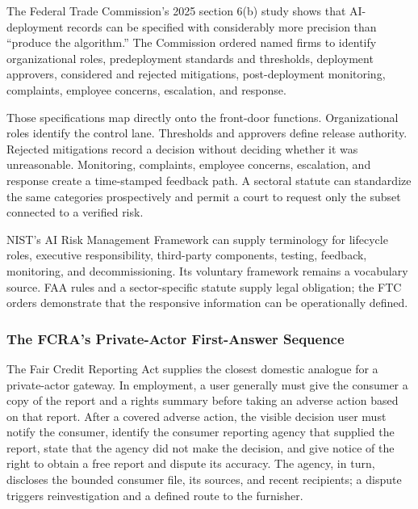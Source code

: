 The Federal Trade Commission's 2025 section 6(b) study shows that AI-deployment records can be specified with considerably more precision than ``produce the algorithm.'' The Commission ordered named firms to identify organizational roles, predeployment standards and thresholds, deployment approvers, considered and rejected mitigations, post-deployment monitoring, complaints, employee concerns, escalation, and response.

Those specifications map directly onto the front-door functions. Organizational roles identify the control lane. Thresholds and approvers define release authority. Rejected mitigations record a decision without deciding whether it was unreasonable. Monitoring, complaints, employee concerns, escalation, and response create a time-stamped feedback path. A sectoral statute can standardize the same categories prospectively and permit a court to request only the subset connected to a verified risk.

NIST's AI Risk Management Framework can supply terminology for lifecycle roles, executive responsibility, third-party components, testing, feedback, monitoring, and decommissioning. Its voluntary framework remains a vocabulary source. FAA rules and a sector-specific statute supply legal obligation; the FTC orders demonstrate that the responsive information can be operationally defined.

\subsubsection{The FCRA's Private-Actor First-Answer Sequence}

The Fair Credit Reporting Act supplies the closest domestic analogue for a private-actor gateway. In employment, a user generally must give the consumer a copy of the report and a rights summary before taking an adverse action based on that report. After a covered adverse action, the visible decision user must notify the consumer, identify the consumer reporting agency that supplied the report, state that the agency did not make the decision, and give notice of the right to obtain a free report and dispute its accuracy. The agency, in turn, discloses the bounded consumer file, its sources, and recent recipients; a dispute triggers reinvestigation and a defined route to the furnisher.


